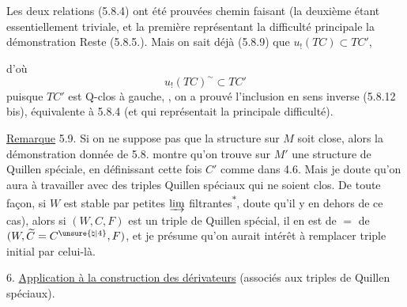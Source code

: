 Les deux relations (5.8.4) ont été prouvées
chemin faisant (la deuxième étant essentiellement triviale, et la première représentant
la difficulté principale  la démonstration
Reste  (5.8.5.). Mais on sait
déjà (5.8.9) que $u_{!}(TC)\subset TC'$,


d'où
\[
 u_{!}(TC)^{\sim}\subset TC'
\]
puisque $TC'$ est Q-clos à gauche,  ,  on a  prouvé l'inclusion en sens inverse (5.8.12 bis),
 équivalente à 5.8.4 (et qui représentait
la principale difficulté).

\uline{Remarque} 5.9. Si on ne suppose pas que la
 structure sur $M$ soit close, alors
la démonstration donnée de 5.8. montre
qu'on trouve  sur $M'$ une
structure de Quillen spéciale, en définissant
cette fois $C'$ comme dans 4.6. Mais je
doute qu'on aura  à travailler avec des
triples  Quillen spéciaux qui ne soient
clos. De toute façon, si $W$ est
stable par petites $\varinjlim$ filtrantes\textsuperscript{$*$},
  doute qu'il y   
en dehors de ce cas), alors si
$(W,C,F)$ est un triple de Quillen
spécial, il en est de $=$ de $(W,\widetilde C=C^{\unsure{\natural|4}},F)$,
et je présume qu'on  aurait intérêt
à remplacer  triple initial par celui-là.


6. \uline{Application à la construction des dérivateurs}
(associés aux triples de Quillen spéciaux).

